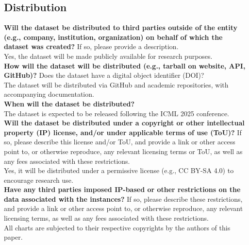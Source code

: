 \subsection{Distribution}

    \textcolor{\sectioncolor}{\textbf{Will the dataset be distributed to third parties outside of the entity
    (e.g., company, institution, organization) on behalf of which the dataset
    was created?
    }
    If so, please provide a description.
    } \\
    Yes, the dataset will be made publicly available for research purposes. \\

    \textcolor{\sectioncolor}{\textbf{How will the dataset will be distributed (e.g., tarball on website, API,
    GitHub)?
    }
    Does the dataset have a digital object identifier (DOI)?
    } \\
    The dataset will be distributed via GitHub and academic repositories, with accompanying documentation. \\

    \textcolor{\sectioncolor}{\textbf{When will the dataset be distributed?
    }
    } \\
    The dataset is expected to be released following the ICML 2025 conference. \\

    \textcolor{\sectioncolor}{\textbf{Will the dataset be distributed under a copyright or other intellectual
    property (IP) license, and/or under applicable terms of use (ToU)?
    }
    If so, please describe this license and/or ToU, and provide a link or other
    access point to, or otherwise reproduce, any relevant licensing terms or
    ToU, as well as any fees associated with these restrictions.
    } \\
    Yes, it will be distributed under a permissive license (e.g., CC BY-SA 4.0) to encourage research use. \\

    \textcolor{\sectioncolor}{\textbf{Have any third parties imposed IP-based or other restrictions on the data
    associated with the instances?
    }
    If so, please describe these restrictions, and provide a link or other
    access point to, or otherwise reproduce, any relevant licensing terms, as
    well as any fees associated with these restrictions.
    } \\
    All charts are subjected to their respective copyrights by the authors of this paper. \\


